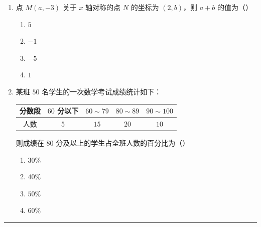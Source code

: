 \documentclass[12pt, a4paper]{ctexart}
\newcommand{\blank}[1]{\underline{\hspace{#1}}}
\begin{document}
\begin{enumerate}[label=\textbf{\arabic*.}, leftmargin=2.5em]
\vspace{6pt}

\item 点 $M(a, -3)$ 关于 $x$ 轴对称的点 $N$ 的坐标为 $(2, b)$，则 $a + b$ 的值为（\blank{1cm}）
\begin{enumerate}[label=\Alph*., nosep]
\item $5$
\item $-1$
\item $-5$
\item $1$
\end{enumerate}

\vspace{6pt}

\item 某班 $50$ 名学生的一次数学考试成绩统计如下：

\begin{center}
\begin{tabular}{|c|c|c|c|c|}
\hline
分数段 & $60$ 分以下 & $60\sim79$ & $80\sim89$ & $90\sim100$ \\
\hline
人数 & $5$ & $15$ & $20$ & $10$ \\
\hline
\end{tabular}
\end{center}

则成绩在 $80$ 分及以上的学生占全班人数的百分比为（\blank{1cm}）
\begin{enumerate}[label=\Alph*., nosep]
\item $30\%$
\item $40\%$
\item $50\%$
\item $60\%$
\end{enumerate}

\end{enumerate}

\vspace{10pt}
\noindent\rule{\textwidth}{0.8pt}

\vspace{8pt}

\vspace{6pt}
\end{document}
